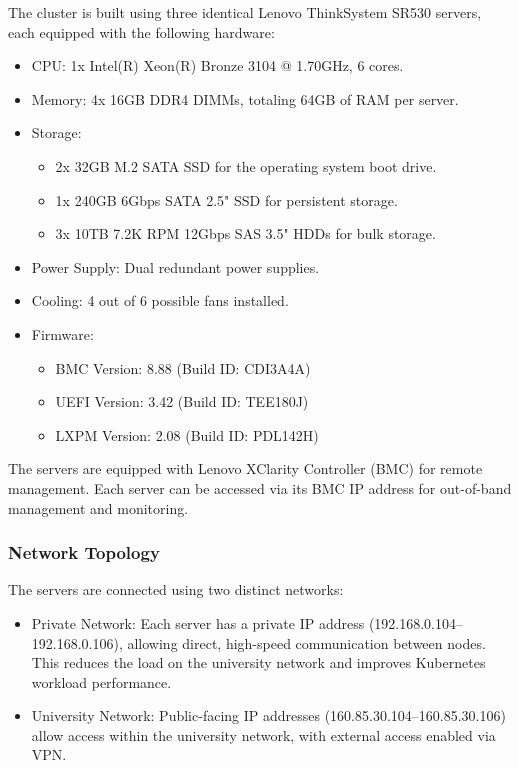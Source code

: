 The cluster is built using three identical Lenovo ThinkSystem SR530 servers, each equipped with the following hardware:

\begin{itemize}
\item CPU: 1x Intel(R) Xeon(R) Bronze 3104 @ 1.70GHz, 6 cores.
\item Memory: 4x 16GB DDR4 DIMMs, totaling 64GB of RAM per server.
\item Storage:
\begin{itemize}
\item 2x 32GB M.2 SATA SSD for the operating system boot drive.
\item 1x 240GB 6Gbps SATA 2.5" SSD for persistent storage.
\item 3x 10TB 7.2K RPM 12Gbps SAS 3.5" HDDs for bulk storage.
\end{itemize}
\item Power Supply: Dual redundant power supplies.
\item Cooling: 4 out of 6 possible fans installed.
\item Firmware:
\begin{itemize}
\item BMC Version: 8.88 (Build ID: CDI3A4A)
\item UEFI Version: 3.42 (Build ID: TEE180J)
\item LXPM Version: 2.08 (Build ID: PDL142H)
\end{itemize}
\end{itemize}

The servers are equipped with Lenovo XClarity Controller (BMC) for remote management. Each server can be accessed via its BMC IP address for out-of-band management and monitoring.

\subsubsection{Network Topology}

The servers are connected using two distinct networks:

\begin{itemize}
\item Private Network: Each server has a private IP address (192.168.0.104–192.168.0.106), allowing direct, high-speed communication between nodes. This reduces the load on the university network and improves Kubernetes workload performance.
\item University Network: Public-facing IP addresses (160.85.30.104–160.85.30.106) allow access within the university network, with external access enabled via VPN.
\end{itemize}

